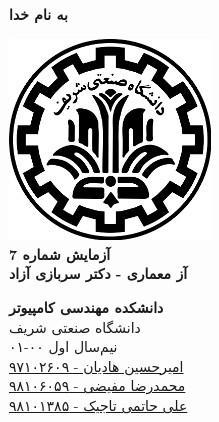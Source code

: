 \documentclass{article}
\begin{document}
\begin{titlepage}
	\begin{center}
		\textbf{ \Huge{به نام خدا}}
	
		\vspace{0.2cm}
		
		\includegraphics[width=0.4\textwidth]{sharif.png}\\
		\vspace{0.2cm}
		\textbf{ \Huge{آزمایش شماره 7}}\\
		\vspace{0.25cm}
		\textbf{ \Large{آز معماری - دکتر سربازی آزاد}}
		\vspace{0.2cm}
		
		
		\large \textbf{دانشکده مهندسی کامپیوتر}\\\vspace{0.1cm}
		\large   دانشگاه صنعتی شریف\\\vspace{0.2cm}
		\large   ﻧﯿﻢ‌سال اول ۰۰-۰۱ \\\vspace{0.10cm}
		\large{\href{mailto:a.h.hadian@gmail.com}{امیرحسین هادیان - ۹۷۱۰۲۶۰۹}}\\
		\large{\href{mailto:mofayezi.m@gmail.com}{محمدرضا مفیضی - ۹۸۱۰۶۰۵۹}}\\
		\large{\href{mailto:a.hatam008@gmail.com}{علی حاتمی تاجیک - ۹۸۱۰۱۳۸۵}}\\
	\end{center}
\end{titlepage}

\newpage

\pagestyle{fancy}
\fancyhf{}
\fancyfoot{}
\setlength{\headheight}{59pt}
\cfoot{\thepage}
\end{document}
